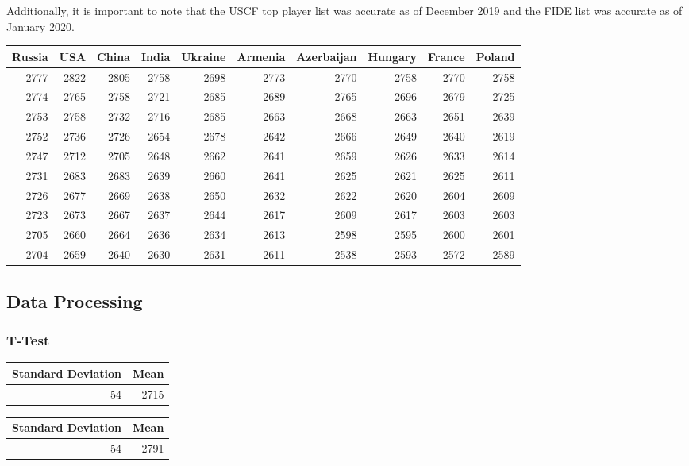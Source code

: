 \documentclass[12pt]{article}
\begin{document}
Additionally, it is important to note that the USCF top player list was accurate as of December 2019 and the FIDE list was accurate as of January 2020. 

\begin{center}
\begin{tabular}{rrrrrrrrrr}
Russia & USA & China & India & Ukraine & Armenia & Azerbaijan & Hungary & France & Poland\\
\hline
2777 & 2822 & 2805 & 2758 & 2698 & 2773 & 2770 & 2758 & 2770 & 2758\\
2774 & 2765 & 2758 & 2721 & 2685 & 2689 & 2765 & 2696 & 2679 & 2725\\
2753 & 2758 & 2732 & 2716 & 2685 & 2663 & 2668 & 2663 & 2651 & 2639\\
2752 & 2736 & 2726 & 2654 & 2678 & 2642 & 2666 & 2649 & 2640 & 2619\\
2747 & 2712 & 2705 & 2648 & 2662 & 2641 & 2659 & 2626 & 2633 & 2614\\
2731 & 2683 & 2683 & 2639 & 2660 & 2641 & 2625 & 2621 & 2625 & 2611\\
2726 & 2677 & 2669 & 2638 & 2650 & 2632 & 2622 & 2620 & 2604 & 2609\\
2723 & 2673 & 2667 & 2637 & 2644 & 2617 & 2609 & 2617 & 2603 & 2603\\
2705 & 2660 & 2664 & 2636 & 2634 & 2613 & 2598 & 2595 & 2600 & 2601\\
2704 & 2659 & 2640 & 2630 & 2631 & 2611 & 2538 & 2593 & 2572 & 2589\\
\end{tabular}
\end{center}

\subsection{Data Processing}
\subsubsection{T-Test}

\begin{center}
\begin{tabular}{rr}
Standard Deviation & Mean\\
\hline
54 & 2715\\
\end{tabular}
\end{center}

\begin{center}
\begin{tabular}{rr}
Standard Deviation & Mean\\
\hline
54 & 2791\\
\end{tabular}
\end{center}
\end{document}

